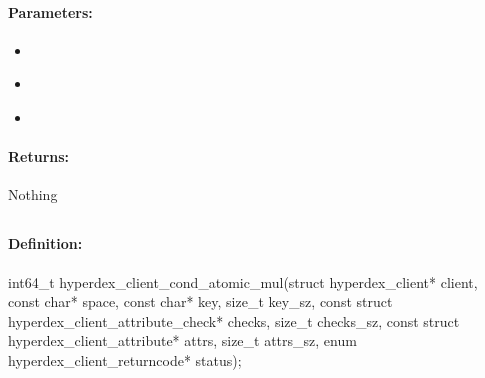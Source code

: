 \paragraph{Parameters:}
\begin{itemize}[noitemsep]
\item {}\\

\item {}\\

\item {}\\

\end{itemize}

\paragraph{Returns:}
Nothing
\pagebreak
\subsection{}
\label{api:c:cond_atomic_mul}


\paragraph{Definition:}
\begin{ccode}
int64_t hyperdex_client_cond_atomic_mul(struct hyperdex_client* client,
        const char* space,
        const char* key, size_t key_sz,
        const struct hyperdex_client_attribute_check* checks, size_t checks_sz,
        const struct hyperdex_client_attribute* attrs, size_t attrs_sz,
        enum hyperdex_client_returncode* status);
\end{ccode}

